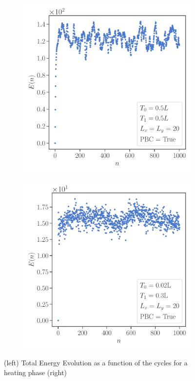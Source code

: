\documentclass[11pt, a4paper]{article}
\theoremstyle{definition} %
\begin{document}
\begin{figure}[h]
\centering
\begin{subfigure}[t]{0.49\textwidth}
	\centering
	\includegraphics[width =\textwidth]{TotalEnergyHeating2d}
\end{subfigure}
\begin{subfigure}[t]{0.49\textwidth}
	\centering
	\includegraphics[width =\textwidth]{TotalEnergyNonHeating2d}
\end{subfigure}
\caption{(left) Total Energy Evolution as a function of the cycles for a heating phase (right)}
\end{figure}
\end{document}
